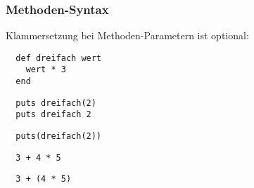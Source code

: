 \begin{frame}[fragile]
  \frametitle{Methoden-Syntax}
  Klammersetzung bei Methoden-Parametern ist optional:
  \begin{lstlisting}
  def dreifach wert 
    wert * 3
  end
  \end{lstlisting}
  \pause
  \begin{lstlisting}
  puts dreifach(2) 
  puts dreifach 2 
  \end{lstlisting}
  \pause
  \begin{lstlisting}
  puts(dreifach(2)) 
  \end{lstlisting}
  
  \pause
  \begin{lstlisting}
  3 + 4 * 5 
  \end{lstlisting}
  \pause
  \begin{lstlisting}
  3 + (4 * 5)
  \end{lstlisting}
\end{frame}


